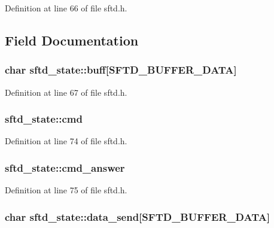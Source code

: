 Definition at line 66 of file sftd.h.



\subsection{Field Documentation}
\hypertarget{structsftd__state_a7592a31166152ec71e5c82df4bec0ff6}{
\subsubsection[{buff}]{\setlength{\rightskip}{0pt plus 5cm}char {\bf sftd\_\-state::buff}\mbox{[}SFTD\_\-BUFFER\_\-DATA\mbox{]}}}
\label{structsftd__state_a7592a31166152ec71e5c82df4bec0ff6}


Definition at line 67 of file sftd.h.

\hypertarget{structsftd__state_a0018f34317e438d32f3b5de5f1adc794}{
\subsubsection[{cmd}]{ {\bf sftd\_\-state::cmd}}}
\label{structsftd__state_a0018f34317e438d32f3b5de5f1adc794}


Definition at line 74 of file sftd.h.

\hypertarget{structsftd__state_acee890ae951e741a8c81d459f151770f}{
\subsubsection[{cmd\_\-answer}]{ {\bf sftd\_\-state::cmd\_\-answer}}}
\label{structsftd__state_acee890ae951e741a8c81d459f151770f}


Definition at line 75 of file sftd.h.

\hypertarget{structsftd__state_aa96301eab5ae247fc2a8e6e6c526fec8}{
\subsubsection[{data\_\-send}]{\setlength{\rightskip}{0pt plus 5cm}char {\bf sftd\_\-state::data\_\-send}\mbox{[}SFTD\_\-BUFFER\_\-DATA\mbox{]}}}
\label{structsftd__state_aa96301eab5ae247fc2a8e6e6c526fec8}


